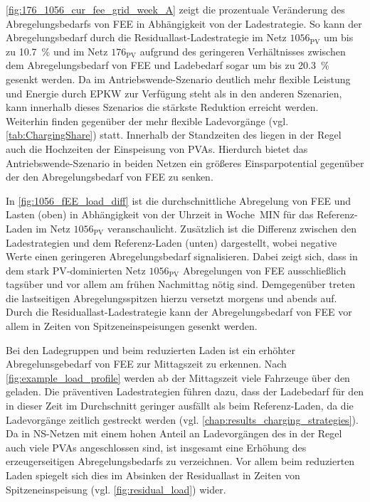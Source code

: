 

\autoref{fig:176_1056_cur_fee_grid_week_A} zeigt die prozentuale Veränderung des Abregelungsbedarfs von \gls{FEE} in Abhängigkeit von der Ladestrategie.
So kann der Abregelungsbedarf durch die Residuallast-Ladestrategie im Netz \(1056_{\text{PV}}\) um bis zu \SI{10.7}{\percent} und im Netz \(176_{\text{PV}}\) aufgrund des geringeren Verhältnisses zwischen dem Abregelungsbedarf von \gls{FEE} und Ladebedarf sogar um bis zu \SI{20.3}{\percent} gesenkt werden.
Da im Antriebswende-Szenario deutlich mehr flexible Leistung und Energie durch \gls{EPKW} zur Verfügung steht als in den anderen Szenarien, kann innerhalb dieses Szenarios die stärkste Reduktion erreicht werden.
Weiterhin finden gegenüber der \SzeFirmenparkplatz mehr flexible Ladevorgänge (vgl. \autoref{tab:ChargingShare}) statt.
Innerhalb der Standzeiten des \UC \Firmeparkplatz liegen in der Regel auch die Hochzeiten der Einspeisung von \glspl{PVA}.
Hierdurch bietet das Antriebswende-Szenario in beiden Netzen ein größeres Einsparpotential gegenüber der \SzeFirmenparkplatz den Abregelungsbedarf von \gls{FEE} zu senken.



In \autoref{fig:1056_fEE_load_diff} ist die durchschnittliche Abregelung von \gls{FEE} und Lasten (oben) in Abhängigkeit von der Uhrzeit in Woche~MIN für das Referenz-Laden im Netz \(1056_{\text{PV}}\) veranschaulicht.
Zusätzlich ist die Differenz zwischen den Ladestrategien und dem Referenz-Laden (unten) dargestellt, wobei negative Werte einen geringeren Abregelungsbedarf signalisieren.
Dabei zeigt sich, dass in dem stark \gls{PV}-dominierten Netz \(1056_{\text{PV}}\) Abregelungen von \gls{FEE} ausschließlich tagsüber und vor allem am frühen Nachmittag nötig sind.
Demgegenüber treten die lastseitigen Abregelungsspitzen hierzu versetzt morgens und abends auf.
Durch die Residuallast-Ladestrategie kann der Abregelungsbedarf von \gls{FEE} vor allem in Zeiten von Spitzeneinspeisungen gesenkt werden.\medskip

Bei den Ladegruppen und beim reduzierten Laden ist ein erhöhter Abregelunsgebedarf von \gls{FEE} zur Mittagszeit zu erkennen.
Nach \autoref{fig:example_load_profile} werden ab der Mittagszeit viele Fahrzeuge über den \UC \zH geladen.
Die präventiven Ladestrategien führen dazu, dass der Ladebedarf für den \UC \zH in dieser Zeit im Durchschnitt geringer ausfällt als beim Referenz-Laden, da die Ladevorgänge zeitlich gestreckt werden (vgl. \autoref{chap:results_charging_strategies}).
Da in \gls{NS}-Netzen mit einem hohen Anteil an Ladevorgängen des \UC \zH in der Regel auch viele \glspl{PVA} angeschlossen sind, ist insgesamt eine Erhöhung des erzeugerseitigen Abregelungsbedarfs zu verzeichnen.
Vor allem beim reduzierten Laden spiegelt sich dies im Absinken der Residuallast in Zeiten von Spitzeneinspeisung (vgl. \autoref{fig:residual_load}) wider.

